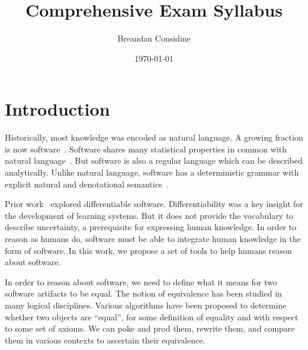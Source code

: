 \documentclass[11pt]{article}
\title{Comprehensive Exam Syllabus}
\author{Breandan Considine}
\date{\today}
\begin{document}
    \maketitle

    \tableofcontents
    \pagebreak

%

    \section{Introduction}

    Historically, most knowledge was encoded as natural language. A growing fraction is now software~\citep{allamanis2018survey}. Software shares many statistical properties in common with natural language~\citep{hindle2012naturalness}. But software is also a regular language which can be described analytically. Unlike natural language, software has a deterministic grammar with explicit natural and denotational semantics~\citep{pierce2010software}.

    Prior work~\citep{considine2019kotlingrad,considine2019programming} explored differentiable software. Differentiability was a key insight for the development of learning systems. But it does not provide the vocabulary to describe uncertainty, a prerequisite for expressing human knowledge. In order to reason as humans do, software must be able to integrate human knowledge in the form of software. In this work, we propose a set of tools to help humans reason about software.

    In order to reason about software, we need to define what it means for two software artifacts to be equal. The notion of equivalence has been studied in many logical disciplines. Various algorithms have been proposed to determine whether two objects are ``equal'', for some definition of equality and with respect to some set of axioms. We can poke and prod them, rewrite them, and compare them in various contexts to ascertain their equivalence.
\end{document}
